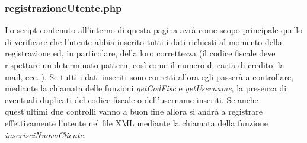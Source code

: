 \documentclass [a4paper, 12pt]{book}
\begin{document}
\subsubsection{registrazioneUtente.php}
Lo script contenuto all'interno di questa pagina avrà come scopo principale quello di verificare che l'utente abbia inserito tutti i dati richiesti al momento della registrazione ed, in particolare, della loro correttezza (il codice fiscale deve rispettare un determinato pattern, così come il numero di carta di credito, la mail, ecc..).  Se tutti i dati inseriti sono corretti allora egli passerà a controllare, mediante la chiamata delle funzioni \textit{getCodFisc} e \textit{getUsername}, la presenza di eventuali duplicati del codice fiscale o dell'username inseriti. Se anche quest'ultimi due controlli vanno a buon fine allora si andrà a registrare effettivamente l'utente nel file XML mediante la chiamata della funzione \textit{inserisciNuovoCliente}.
\end{document}
